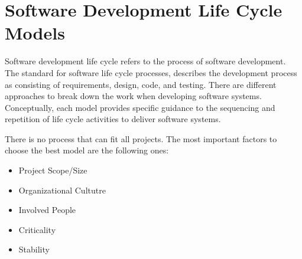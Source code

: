 %
\chapter{Software Development Life Cycle Models}%
Software development life cycle refers to the process of software development.
The standard for software life cycle processes, describes the development
process as consisting of requirements, design, code, and testing.
There are different approaches to break down the work when developing software
systems. Conceptually, each model provides specific guidance to the
sequencing and repetition of life cycle activities to deliver software systems.

\vspace{3mm}

There is no process that can fit all projects. The most important factors
to choose the best model are the following ones:
\begin{itemize}
\item Project Scope/Size
\item Organizational Cultutre
\item Involved People
\item Criticality
\item Stability
\end{itemize}

